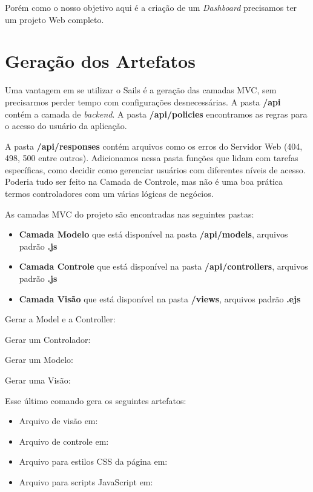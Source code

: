 \documentclass[a4paper,11pt]{article}
\begin{document}
Porém como o nosso objetivo aqui é a criação de um \textit{Dashboard} precisamos ter um projeto Web completo.

\section{Geração dos Artefatos}
Uma vantagem em se utilizar o Sails é a geração das camadas MVC, sem precisarmos perder tempo com configurações desnecessárias. A pasta \textbf{/api} contém a camada de \textit{backend}. A pasta \textbf{/api/policies} encontramos as regras para o acesso do usuário da aplicação. 

A pasta \textbf{/api/responses} contém arquivos como os erros do Servidor Web (404, 498, 500 entre outros). Adicionamos nessa pasta funções que lidam com tarefas específicas, como decidir como gerenciar usuários com diferentes níveis de acesso. Poderia tudo ser feito na Camada de Controle, mas não é uma boa prática termos controladores com um várias lógicas de negócios.

As camadas MVC do projeto são encontradas nas seguintes pastas: \vspace{-1em}
\begin{itemize}
  \item \textbf{Camada Modelo} que está disponível na pasta \textbf{/api/models}, arquivos padrão \textbf{.js}
  \item \textbf{Camada Controle} que está disponível na pasta \textbf{/api/controllers}, arquivos padrão \textbf{.js}
  \item \textbf{Camada Visão} que está disponível na pasta \textbf{/views}, arquivos padrão \textbf{.ejs}
\end{itemize}

Gerar a Model e a Controller: \\

Gerar um Controlador: \\

Gerar um Modelo: \\

Gerar uma Visão: \\

Esse último comando gera os seguintes artefatos: \vspace{-1em}
\begin{itemize}
	\item Arquivo de visão em: 
	\item Arquivo de controle em: 
	\item Arquivo para estilos CSS da página em: 
	\item Arquivo para scripts JavaScript em: 
\end{itemize}
\end{document}
